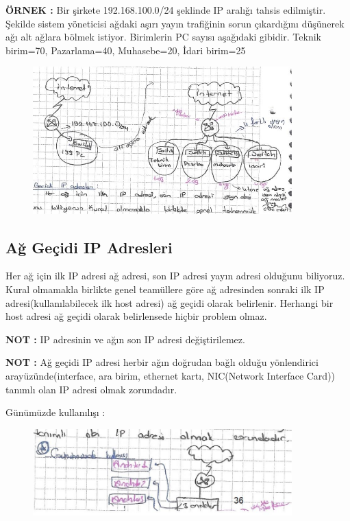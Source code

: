 \textbf{ÖRNEK : } Bir şirkete 192.168.100.0/24 şeklinde IP aralığı tahsis edilmiştir. Şekilde sistem yöneticisi ağdaki aşırı yayın trafiğinin sorun çıkardığını düşünerek ağı alt ağlara bölmek istiyor. Birimlerin PC sayısı aşağıdaki gibidir. Teknik birim=70, Pazarlama=40, Muhasebe=20, İdari birim=25  

\begin{figure}[!ht] \centering \includegraphics[width=10cm]{
images/sayfa36} \label{fig:Şirket örneği} \end{figure}

\subsection{Ağ Geçidi IP Adresleri }

Her ağ için ilk IP adresi ağ adresi, son IP adresi yayın adresi olduğunu biliyoruz. Kural olmamakla birlikte genel teamüllere göre ağ adresinden sonraki ilk IP adresi(kullanılabilecek ilk host adresi) ağ geçidi olarak belirlenir. Herhangi bir host adresi ağ geçidi olarak belirlensede hiçbir problem  olmaz. 

\textbf{NOT : } IP adresinin ve ağın son IP adresi değiştirilemez. 

\textbf{NOT : } Ağ geçidi IP adresi herbir ağın doğrudan bağlı olduğu yönlendirici arayüzünde(interface, ara birim, ethernet kartı, NIC(Network Interface Card)) tanımlı olan IP adresi olmak zorundadır. 

Günümüzde kullanılışı : 

\begin{figure}[!ht] \centering \includegraphics[width=10cm]{
images/sayfa36sonresim} \label{fig:Şirket örneği} \end{figure}

